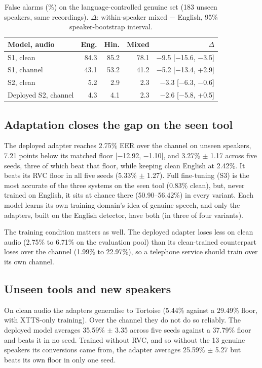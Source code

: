 \documentclass[conference]{IEEEtran}
\begin{document}
\begin{table}[t]
\centering
\caption{False alarms (\%) on the language-controlled genuine set (183 unseen speakers,
same recordings). $\Delta$: within-speaker mixed $-$ English, 95\% speaker-bootstrap
interval.}
\label{tab:lang}
\small
\setlength{\tabcolsep}{4pt}
\begin{tabular}{@{}lrrrr@{}}
\toprule
Model, audio & Eng. & Hin. & Mixed & $\Delta$ \\
\midrule
S1, clean            & 84.3 & 85.2 & 78.1 & $-$9.5 [$-$15.6, $-$3.5] \\
S1, channel          & 43.1 & 53.2 & 41.2 & $-$5.2 [$-$13.4, +2.9] \\
S2, clean            & 5.2  & 2.9  & 2.3  & $-$3.3 [$-$6.3, $-$0.6] \\
Deployed S2, channel & 4.3  & 4.1  & 2.3  & $-$2.6 [$-$5.8, +0.5] \\
\bottomrule
\end{tabular}
\end{table}

\subsection{Adaptation closes the gap on the seen tool}

The deployed adapter reaches 2.75\% EER over the channel on unseen speakers, 7.21 points
below its matched floor [$-$12.92, $-$1.10], and 3.27\% $\pm$ 1.17 across five seeds,
three of which beat that floor, while keeping clean English at 2.42\%. It beats its RVC floor in all five seeds (5.33\%
$\pm$ 1.27). Full fine-tuning (S3) is the most accurate of the three systems on the seen tool
(0.83\% clean), but, never trained on English, it sits at chance there (50.90--56.42\%) in
every variant. Each model learns its own training domain's idea of genuine speech, and only
the adapters, built on the English detector, have both (in three of four variants).

The training condition matters as well. The deployed adapter loses less on clean audio
(2.75\% to 6.71\% on the evaluation pool) than its clean-trained counterpart loses over the
channel (1.99\% to 22.97\%), so a telephone service should train over its own channel.

\subsection{Unseen tools and new speakers}

On clean audio the adapters generalise to Tortoise (5.44\% against a 29.49\% floor, with
XTTS-only training). Over the channel they do not do so reliably. The deployed model
averages 35.59\% $\pm$ 3.35 across five seeds against a 37.79\% floor and beats it in no
seed. Trained without RVC, and so without the 13 genuine speakers its conversions came
from, the adapter averages 25.59\% $\pm$ 5.27 but beats its own floor in only one seed.
\end{document}
